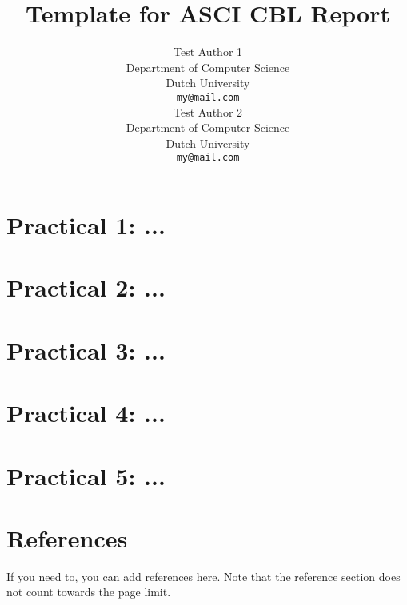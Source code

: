 \documentclass{article}
\title{Template for ASCI CBL Report}
\author{%
  Test Author 1 \\
  Department of Computer Science\\
  Dutch University\\
  \texttt{my@mail.com} \\
  \And
  Test Author 2 \\
  Department of Computer Science\\
  Dutch University\\
  \texttt{my@mail.com} \\
}
\begin{document}
\maketitle

\section*{Practical 1: ...}

\section*{Practical 2: ...}

\section*{Practical 3: ...}

\section*{Practical 4: ...}

\section*{Practical 5: ...}


\section*{References}

If you need to, you can add references here.
Note that the reference section does not count towards the page limit.
\medskip
\end{document}
